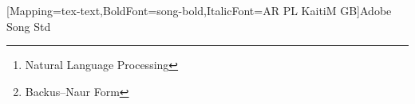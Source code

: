 {
 [Mapping=tex-text,BoldFont=song-bold,ItalicFont=AR PL KaitiM GB]{Adobe Song Std}

\renewcommand{\abstractname}{摘要}
\renewcommand{\keywordsname}{关键词：}

\begin{abstract}
许多工作，比如 \emph{机器翻译}，\emph{人工语言处理(NLP)}，需要对英文文本的真正意思进行理解。而为输入构筑语法树（CST，Concrete Syntax Tree， or Parse Tree\cite{cst}）是``理解''的第一步。本论文叙述的就是为英语构筑语法树一种可能的方式。它利用了前人研究成果 \emph{基于隐马尔科夫模型(HMM)的语法标记}、\emph{基于巴科斯范式(BNF)的自然语言处理} 
构筑语法解析程序。

\end{abstract}

}

\clearpage

\begin{abstract}
Real understanding of English text is required by much of tasks such as \emph{Machine Translation}, \emph{NLP\footnote{Natural Language Processing}}, etc. Building Concrete Syntax \mbox{Tree \cite{cst}} is the very first step of the \mbox{understanding} process. This thesis brings you one possible way of building Parse Tree of Natural Language -- English. It employs \emph{HMM based part-of-speech tagging} and \emph{BNF\footnote{Backus–Naur Form\protect\cite{BNF}} based Natural Language Parse Program}. 

\end{abstract}

\clearpage